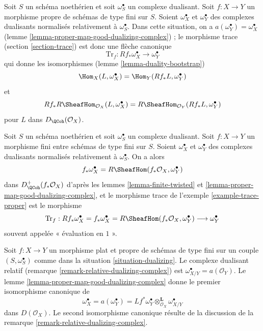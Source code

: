 \begin{example}
\label{example-trace-proper}
Soit $S$ un schéma noethérien et soit $\omega_S^\bullet$ un complexe dualisant. Soit $f : X \to Y$ un morphisme propre de schémas de type fini sur $S$. Soient $\omega_X^\bullet$ et $\omega_Y^\bullet$ des complexes dualisants normalisés relativement à $\omega_S^\bullet$. Dans cette situation, on a $a(\omega_Y^\bullet) = \omega_X^\bullet$ (lemme \ref{lemma-proper-map-good-dualizing-complex}) ; le morphisme trace (section \ref{section-trace}) est donc une flèche canonique
$$
\text{Tr}_f : Rf_*\omega_X^\bullet \longrightarrow \omega_Y^\bullet
$$
qui donne les isomorphismes (lemme \ref{lemma-duality-bootstrap})
$$
\Hom_X(L, \omega_X^\bullet) = \Hom_Y(Rf_*L, \omega_Y^\bullet)
$$
et
$$
Rf_*R\SheafHom_{\mathcal{O}_X}(L, \omega_X^\bullet) =
R\SheafHom_{\mathcal{O}_Y}(Rf_*L, \omega_Y^\bullet)
$$
pour $L$ dans $D_\QCoh(\mathcal{O}_X)$.
\end{example}

\begin{remark}
\label{remark-dualizing-finite}
Soit $S$ un schéma noethérien et soit $\omega_S^\bullet$ un complexe dualisant. Soit $f : X \to Y$ un morphisme fini entre schémas de type fini sur $S$. Soient $\omega_X^\bullet$ et $\omega_Y^\bullet$ des complexes dualisants normalisés relativement à $\omega_S^\bullet$. On a alors
$$
f_*\omega_X^\bullet = R\SheafHom(f_*\mathcal{O}_X, \omega_Y^\bullet)
$$
dans $D_\QCoh^+(f_*\mathcal{O}_X)$ d'après les lemmes \ref{lemma-finite-twisted} et \ref{lemma-proper-map-good-dualizing-complex}, et le morphisme trace de l'exemple \ref{example-trace-proper} est le morphisme
$$
\text{Tr}_f : Rf_*\omega_X^\bullet = f_*\omega_X^\bullet =
R\SheafHom(f_*\mathcal{O}_X, \omega_Y^\bullet) \longrightarrow
\omega_Y^\bullet
$$
souvent appelée « évaluation en $1$ ».
\end{remark}

\begin{remark}
\label{remark-relative-dualizing-complex-shriek}
Soit $f : X \to Y$ un morphisme plat et propre de schémas de type fini sur un couple $(S, \omega_S^\bullet)$ comme dans la situation \ref{situation-dualizing}. Le complexe dualisant relatif (remarque \ref{remark-relative-dualizing-complex}) est $\omega_{X/Y}^\bullet = a(\mathcal{O}_Y)$. Le lemme \ref{lemma-proper-map-good-dualizing-complex} donne le premier isomorphisme canonique de
$$
\omega_X^\bullet = a(\omega_Y^\bullet) =
Lf^*\omega_Y^\bullet \otimes_{\mathcal{O}_X}^\mathbf{L} \omega_{X/Y}^\bullet
$$
dans $D(\mathcal{O}_X)$. Le second isomorphisme canonique résulte de la discussion de la remarque \ref{remark-relative-dualizing-complex}.
\end{remark}




